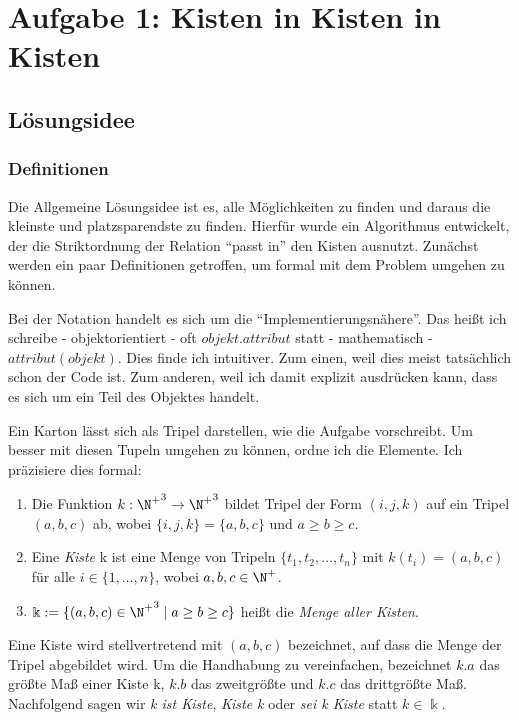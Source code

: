 \section{Aufgabe 1: Kisten in Kisten in Kisten}
\subsection{Lösungsidee}
\subsubsection{Definitionen}
Die Allgemeine Lösungsidee ist es, alle Möglichkeiten zu finden und daraus die kleinste und platzsparendste zu finden.
Hierfür wurde ein Algorithmus entwickelt, der die Striktordnung der Relation ``passt in'' den Kisten ausnutzt.
Zunächst werden ein paar Definitionen getroffen, um formal mit dem Problem umgehen zu können.
\begin{bem}
 Bei der Notation handelt es sich um die ``Implementierungsnähere''.
 Das heißt ich schreibe - objektorientiert - oft $objekt.attribut$ statt - mathematisch - $attribut(objekt)$.
 Dies finde ich intuitiver. Zum einen, weil dies meist tatsächlich schon der Code ist.
 Zum anderen, weil ich damit explizit ausdrücken kann, dass es sich um ein Teil des Objektes handelt.
\end{bem}
Ein Karton lässt sich als Tripel darstellen, wie die Aufgabe vorschreibt. Um besser mit diesen Tupeln umgehen zu können,
ordne ich die Elemente. Ich präzisiere dies formal:
\begin{defi}[Kiste] \hfill
\begin{enumerate}
 \item Die Funktion $k: {\N^+}^3 \to {\N^+}^3$ bildet Tripel der Form $(i,j,k)$ auf ein Tripel $(a,b,c)$ ab, wobei $\{i,j,k\} = \{a,b,c\}$ und $a \geq b \geq c$.
 \item Eine \emph{Kiste} k ist eine Menge von Tripeln $\{t_1, t_2, \dots, t_n\}$ mit $k(t_i) = (a,b,c)$ für alle $i \in \{1,\dots,n\}$, wobei $a,b,c \in \N^+$.
 \item $\Bbbk := \{(a,b,c) \in {\N^+}^3 \mid a \geq b \geq c\}$ heißt die \emph{Menge aller Kisten}.
\end{enumerate}
\end{defi}
\begin{bem}
 Eine Kiste wird stellvertretend mit $(a,b,c)$ bezeichnet, auf dass die Menge der Tripel abgebildet wird. 
 Um die Handhabung zu vereinfachen, bezeichnet $k.a$ das größte Maß einer Kiste k, $k.b$ das zweitgrößte und $k.c$ das drittgrößte Maß. \\
 Nachfolgend sagen wir \emph{k ist Kiste}, \emph{Kiste k} oder \emph{sei k Kiste} statt $k \in \Bbbk$. 
\end{bem}
